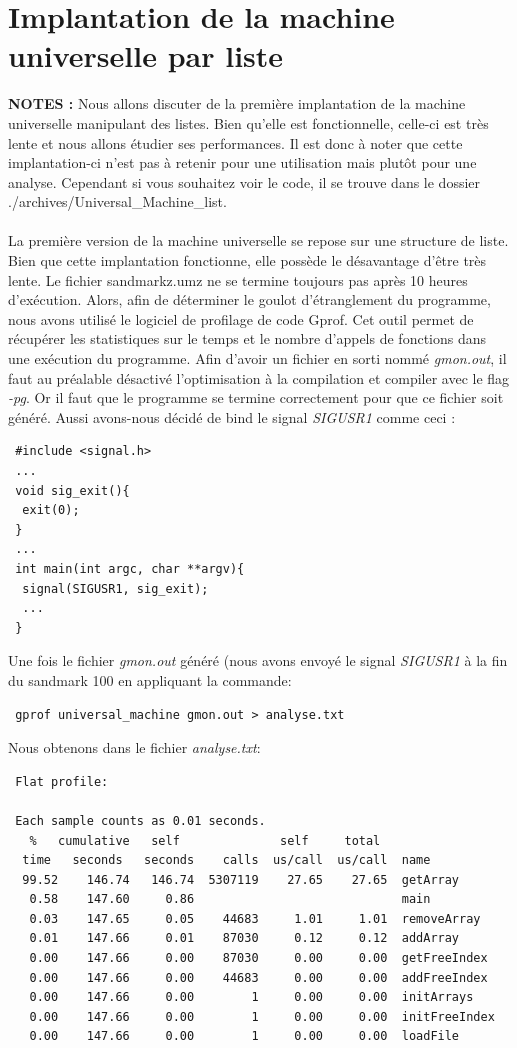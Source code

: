 \documentclass[a4paper,12pt]{report}
\begin{document}
\section{Implantation de la machine universelle par liste}
\textbf{NOTES :} Nous allons discuter de la première implantation de la machine universelle manipulant des listes. Bien qu'elle est fonctionnelle,
celle-ci est très lente et nous allons étudier ses performances. Il est donc à noter que cette implantation-ci n'est pas à retenir pour une
utilisation mais plutôt pour une analyse. Cependant si vous souhaitez voir le code, il se trouve dans le dossier
./archives/Universal\_Machine\_list.
\\ \\
La première version de la machine universelle se repose sur une structure de liste. Bien que cette implantation fonctionne, elle
possède le désavantage d'être très lente. Le fichier sandmarkz.umz ne se termine toujours pas après 10 heures d'exécution.
Alors, afin de déterminer le goulot d'étranglement du programme, nous avons utilisé le logiciel de profilage de code Gprof.
Cet outil permet de récupérer les statistiques sur le temps et le nombre d'appels de fonctions dans une exécution du programme.
Afin d'avoir un fichier en sorti nommé \textit{gmon.out}, il faut au préalable désactivé l'optimisation à la compilation et compiler avec
le flag \textit{-pg}.
Or il faut que le programme se termine correctement pour que ce fichier soit généré. Aussi avons-nous décidé de bind le signal 
\textit{SIGUSR1} comme ceci :
\begin{verbatim}
 #include <signal.h>
 ...
 void sig_exit(){
  exit(0);
 }
 ...
 int main(int argc, char **argv){
  signal(SIGUSR1, sig_exit);
  ...
 }
\end{verbatim}
Une fois le fichier \textit{gmon.out} généré (nous avons envoyé le signal \textit{SIGUSR1} à la fin du sandmark 100 en appliquant la commande:
\begin{verbatim}
 gprof universal_machine gmon.out > analyse.txt
\end{verbatim}
Nous obtenons dans le fichier \textit{analyse.txt}:
\begin{verbatim}
 Flat profile:

 Each sample counts as 0.01 seconds.
   %   cumulative   self              self     total           
  time   seconds   seconds    calls  us/call  us/call  name    
  99.52    146.74   146.74  5307119    27.65    27.65  getArray
   0.58    147.60     0.86                             main
   0.03    147.65     0.05    44683     1.01     1.01  removeArray
   0.01    147.66     0.01    87030     0.12     0.12  addArray
   0.00    147.66     0.00    87030     0.00     0.00  getFreeIndex
   0.00    147.66     0.00    44683     0.00     0.00  addFreeIndex
   0.00    147.66     0.00        1     0.00     0.00  initArrays
   0.00    147.66     0.00        1     0.00     0.00  initFreeIndex
   0.00    147.66     0.00        1     0.00     0.00  loadFile
\end{verbatim}
\end{document}

